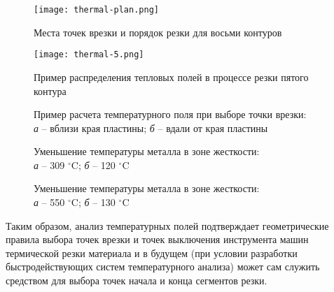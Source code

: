\begin{figure}[p]
  \centering
  \texttt{[image: thermal-plan.png]}
  \caption{
    Места точек врезки и порядок резки для восьми контуров
  }
  \label{thermal-plan}
\end{figure}

\begin{figure}[p]
  \centering
  \texttt{[image: thermal-5.png]}
  \caption{
      Пример распределения тепловых полей в процессе резки пятого контура
    }
  \label{thermal-5}
\end{figure}

\begin{figure}[p]
  \centering
  \caption{
    Пример расчета температурного поля при выборе точки врезки: \\
    {\it а} -- вблизи края пластины;
    {\it б} -- вдали от края пластины
  }
  \label{thermal-field}
\end{figure}

\begin{figure}[p]
  \centering
  \caption{
    Уменьшение температуры металла в зоне жесткости: \\
    {\it а} -- 309 $^\circ$C;
    {\it б} -- 120 $^\circ$C
  }
  \label{thermal-309-120}
\end{figure}

\begin{figure}[p]
  \centering
  \caption{
    Уменьшение температуры металла в зоне жесткости: \\
    {\it а} -- 550 $^\circ$C;
    {\it б} -- 130 $^\circ$C
    }
  \label{thermal-550-130}
\end{figure}

\clearpage

Таким образом,
анализ температурных полей подтверждает
геометрические правила выбора точек врезки
и точек выключения инструмента машин термической
резки материала и в будущем
(при условии разработки быстродействующих систем температурного анализа)
может сам служить средством для выбора точек начала и конца сегментов резки.

